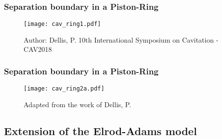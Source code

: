 \documentclass[10pt,aspectratio=169]{beamer}
\begin{document}
\begin{frame}
\frametitle{Separation boundary in a Piston-Ring}
\vspace*{1.0cm}
\begin{figure}
	\centering
	\texttt{[image: cav\_ring1.pdf]}
	\caption{\color{ExecusharesGrey}\tiny Author: Dellis, P. 10th International Symposium on Cavitation - CAV2018}
\end{figure}
\end{frame}

\begin{frame}[noframenumbering]
\frametitle{Separation boundary in a Piston-Ring}
\vspace*{1.0cm}
\begin{figure}
	\centering
	\texttt{[image: cav\_ring2a.pdf]}
	\caption{\color{ExecusharesGrey}\tiny Adapted from the work of Dellis, P.}
\end{figure}
\end{frame}


\setcounter{showSlideNumbers}{0}
\subsection{Extension of the Elrod-Adams model}
\begin{frame}[noframenumbering]
\tableofcontents[
currentsection,
currentsubsection,
subsectionstyle=show/shaded/hide
]
\end{frame}
\setcounter{showSlideNumbers}{1}
\end{document}
